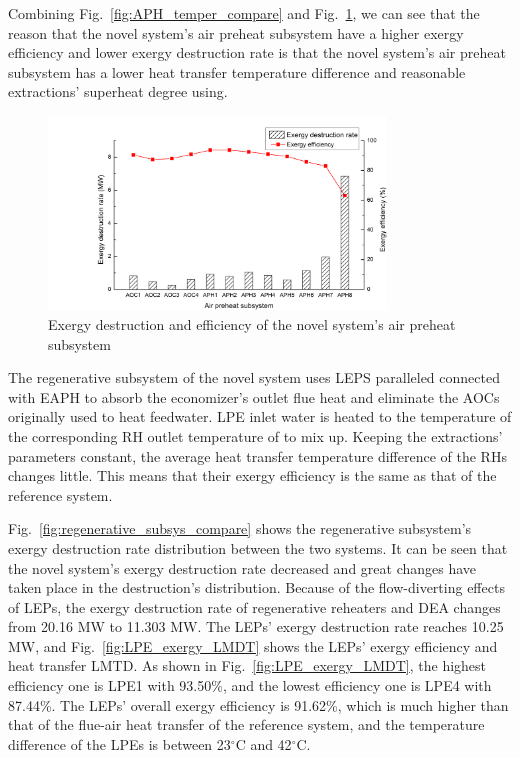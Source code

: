 \documentclass[preprint,12pt]{elsarticle}
\begin{document}
Combining Fig.~\ref{fig:APH_temper_compare} and Fig.~\ref{fig:novel_APH_exergy}, we can see that the reason that the novel system's air preheat subsystem
have a higher exergy efficiency and lower exergy destruction rate is that the novel system's air preheat subsystem has a lower heat transfer temperature difference and reasonable extractions' superheat degree using.


\begin{figure}[htbp]
\centering
\includegraphics[width=0.8\textwidth]{fig/novel_APH_exergy.png}
\caption{Exergy destruction and efficiency of the novel system's air preheat subsystem} %
\label{fig:novel_APH_exergy}
\end{figure}

The regenerative subsystem of the novel system uses LEPS
paralleled connected with EAPH to absorb the economizer's outlet flue heat and eliminate the AOCs originally used to heat feedwater.
LPE inlet water is heated to the temperature of the corresponding RH outlet temperature of to mix up.
Keeping the extractions' parameters constant, the average heat transfer temperature difference of the RHs changes little.
This means that their exergy efficiency is the same as that of the reference system.

Fig.~\ref{fig:regenerative_subsys_compare} shows the regenerative subsystem's exergy destruction rate distribution between the two systems.
It can be seen that the novel system's exergy destruction rate decreased and great changes have taken place in the destruction's distribution.
Because of the flow-diverting effects of LEPs,%
the exergy destruction rate of regenerative reheaters and DEA changes from 20.16 MW to 11.303 MW.
The LEPs' %
exergy destruction rate reaches 10.25 MW, and Fig.~\ref{fig:LPE_exergy_LMDT} shows the LEPs'
exergy efficiency and heat transfer LMTD.
As shown in Fig.~\ref{fig:LPE_exergy_LMDT}, the highest efficiency one is LPE1 with 93.50\%, and the lowest efficiency one is LPE4 with 87.44\%. 
The LEPs'
overall exergy efficiency is 91.62\%, which is much higher than that of the flue-air heat transfer of the reference system, and the temperature difference of the LPEs is between 23$^\circ$C and 42$^\circ$C.
\end{document}
